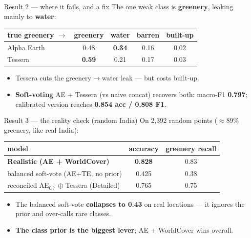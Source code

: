 \documentclass[aspectratio=169]{beamer}
\begin{document}
\begin{frame}{Result 2 --- where it fails, and a fix}
The one weak class is \textbf{greenery}, leaking mainly to \textbf{water}:
\vspace{0.4em}
\centering
\small
\begin{tabular}{l c c c c}
\toprule
\textbf{true greenery $\rightarrow$} & greenery & water & barren & built-up \\
\midrule
Alpha Earth & 0.48 & \textbf{0.34} & 0.16 & 0.02 \\
Tessera     & \textbf{0.59} & 0.21 & 0.17 & 0.03 \\
\bottomrule
\end{tabular}
\vspace{0.8em}
\flushleft
\begin{itemize}\small
  \item Tessera cuts the greenery$\rightarrow$water leak --- but costs built-up.
  \item \textbf{Soft-voting} AE + Tessera (vs naive concat) recovers both:
  macro-F1 \textbf{0.797}; calibrated version reaches \textbf{0.854 acc / 0.808 F1}.
\end{itemize}
\end{frame}

\begin{frame}{Result 3 --- the reality check (random India)}
On 2{,}392 random points ($\approx$89\% greenery, like real India):
\vspace{0.4em}
\centering
\small
\begin{tabular}{l c c}
\toprule
\textbf{model} & \textbf{accuracy} & \textbf{greenery recall} \\
\midrule
\textbf{Realistic (AE + WorldCover)} & \textbf{0.828} & 0.83 \\
balanced soft-vote (AE+TE, no prior) & 0.425 & 0.38 \\
reconciled AE$_{0.7}$ $\oplus$ Tessera (Detailed) & 0.765 & 0.75 \\
\bottomrule
\end{tabular}
\vspace{0.8em}
\flushleft
\begin{itemize}\small
  \item The balanced soft-vote \textbf{collapses to 0.43} on real locations --- it
  ignores the prior and over-calls rare classes.
  \item \textbf{The class prior is the biggest lever}; AE + WorldCover wins overall.
\end{itemize}
\end{frame}
\end{document}
